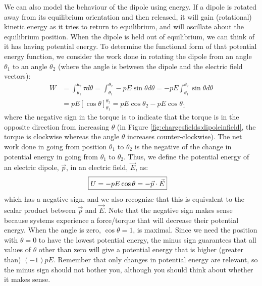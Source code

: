 We can also model the behaviour of the dipole using energy. If a dipole is rotated away from its equilibrium orientation and then released, it will gain (rotational) kinetic energy as it tries to return to equilibrium, and will oscillate about the equilibrium position. When the dipole is held out of equilibrium, we can think of it has having potential energy. To determine the functional form of that potential energy function, we consider the work done in rotating the dipole from an angle $\theta_1$ to an angle $\theta_2$ (where the angle is between the dipole and the electric field vectors):
\begin{align*}
W&=\int_{\theta_1}^{\theta_2} \tau d\theta=\int_{\theta_1}^{\theta_2} -pE\sin\theta d\theta=-pE\int_{\theta_1}^{\theta_2} \sin\theta d\theta\\
&=pE[\cos\theta]_{\theta_1}^{\theta_2}=pE\cos\theta_2-pE\cos\theta_1
\end{align*}
where the negative sign in the torque is to indicate that the torque is in the opposite direction from increasing $\theta$ (in Figure \ref{fig:chargesfields:dipoleinfield}, the torque is clockwise whereas the angle $\theta$ increases counter-clockwise). The net work done in going from position $\theta_1$ to $\theta_2$ is the negative of the change in potential energy in going from $\theta_1$ to $\theta_2$. Thus, we define the potential energy of an electric dipole, $\vec p$, in an electric field, $\vec E$, as:
\begin{align*}
\Aboxed{U=-pE\cos\theta=-\vec p\cdot \vec E}
\end{align*}
which has a negative sign, and we also recognize that this is equivalent to the scalar product between $\vec p$ and $\vec E$. Note that the negative sign makes sense because systems experience a force/torque that will decrease their potential energy. When the angle is zero, $\cos\theta=1$, is maximal. Since we need the position with $\theta=0$ to have the lowest potential energy, the minus sign guarantees that all values of $\theta$ other than zero will give a potential energy that is higher (greater than) $(-1) pE$. Remember that only changes in potential energy are relevant, so the minus sign should not bother you, although you should think about whether it makes sense.

\newpage
